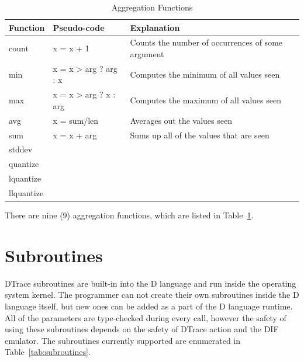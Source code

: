 \begin{table}
  \centering
  \begin{tabular}{l|l|l}
    Function & Pseudo-code & Explanation \\
    \hline
    count & x = x + 1 & Counts the number of occurrences of some argument \\
    min & x = x > arg ? arg : x & Computes the minimum of all values seen \\
    max & x = x > arg ? x : arg & Computes the maximum of all values seen \\
    avg & x = sum/len & Averages out the values seen \\
    sum & x = x + arg & Sums up all of the values that are seen \\
    stddev & & \\
    quantize & & \\
    lquantize & & \\
    llquantize & &
  \end{tabular}
  \caption{Aggregation Functions}
  \label{tab:agg-func}
\end{table}

There are nine (9) aggregation functions, which are listed in
Table~\ref{tab:agg-func}.

\section{Subroutines}
\label{sec:subroutines}

DTrace subroutines are built-in into the D language and run inside the
operating system kernel. The programmer can not create their own subroutines
inside the D language itself, but new ones can be added as a part of the D
language runtime. All of the parameters are type-checked during every call,
however the safety of using these subroutines depends on the safety of DTrace
action and the DIF emulator. The subroutines currently supported are enumerated
in Table~\ref{tab:subroutines}.
